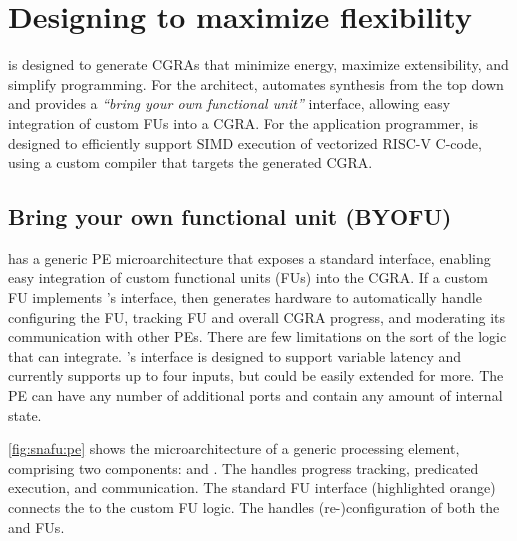 \section{Designing \snafuframe to maximize flexibility}
\label{snafu:flexible}

\snafuframe is designed to generate CGRAs that minimize energy, maximize
extensibility, and simplify programming. 
%
For the architect, \snafuframe automates synthesis from the top down and
provides a \emph{``bring your own functional unit''} interface, allowing easy
integration of custom FUs into a CGRA.
% 
For the application programmer, \snafuframe is designed to efficiently support
SIMD execution of vectorized \mbox{RISC-V} C-code, using a custom compiler that targets the generated CGRA. 

\figSNAFUPE

\subsection{Bring your own functional unit (BYOFU)}
\label{snafu:flexible:byofu}
\snafuframe has a generic PE microarchitecture that exposes a
standard interface, enabling easy integration of custom functional units
(FUs) into the CGRA.
%
If a custom FU implements \snafuframe's interface, then \snafu generates hardware
to automatically handle configuring the FU, tracking FU and
overall CGRA progress, and moderating its communication with other PEs.
% 
There are few limitations on the sort of the logic that \snafuframe can integrate.
% 
\snafuframe's interface is designed to support variable latency and currently supports up to four inputs, but could be easily extended for more.
% 
The PE can have any number of additional ports and contain any amount of internal state.

\autoref{fig:snafu:pe} shows the microarchitecture of a generic \snafuframe processing element,
comprising two components: \ucore and \ucfg.
%
The \ucore handles progress tracking, predicated execution, and communication. 
%
The standard FU interface (highlighted orange) connects the
\ucore to the custom FU logic.  
%
The \ucfg handles (re-)configuration of both the \ucore and FUs.

